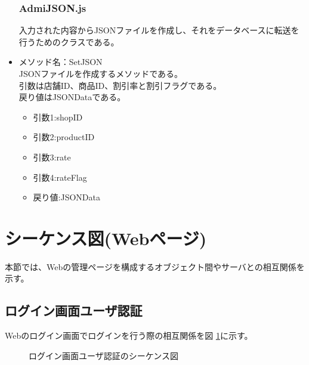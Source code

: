 \documentclass[a4j]{jarticle}
\begin{document}
\begin{itemize}
\subsubsection{AdmiJSON.js}

入力された内容からJSONファイルを作成し、それをデータベースに転送を行うためのクラスである。\\

\item メソッド名：SetJSON\\

JSONファイルを作成するメソッドである。\\
引数は店舗ID、商品ID、割引率と割引フラグである。\\
戻り値はJSONDataである。
	\begin{itemize}
		\item 引数1:shopID
		\item 引数2:productID
		\item 引数3:rate
		\item 引数4:rateFlag
	\end{itemize}
	\begin{itemize}
		\item 戻り値:JSONData
	\end{itemize}
\end{itemize}
\section{シーケンス図(Webページ)}
本節では、Webの管理ページを構成するオブジェクト間やサーバとの相互関係を示す。

\subsection{ログイン画面ユーザ認証}
Webのログイン画面でログインを行う際の相互関係を図 \ref {tab:oonishi1}に示す。
\begin{figure}[H]
\begin{center}
\caption{ログイン画面ユーザ認証のシーケンス図}
\label{tab:oonishi1}
\end{center}
\end{figure}　　
\end{document}
